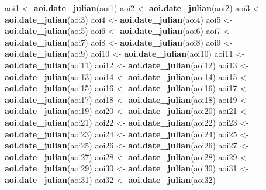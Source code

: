 \documentclass[
]{article}
\newenvironment{Shaded}{\begin{snugshade}}{\end{snugshade}}
\newcommand{\KeywordTok}[1]{\textcolor[rgb]{0.13,0.29,0.53}{\textbf{#1}}}
\newcommand{\NormalTok}[1]{#1}
\newcommand{\StringTok}[1]{\textcolor[rgb]{0.31,0.60,0.02}{#1}}
\begin{document}
\begin{Shaded}
\begin{Highlighting}[]
\NormalTok{aoi1 <-}\StringTok{ }\KeywordTok{aoi.date_julian}\NormalTok{(aoi1)}
\NormalTok{aoi2 <-}\StringTok{ }\KeywordTok{aoi.date_julian}\NormalTok{(aoi2)}
\NormalTok{aoi3 <-}\StringTok{ }\KeywordTok{aoi.date_julian}\NormalTok{(aoi3)}
\NormalTok{aoi4 <-}\StringTok{ }\KeywordTok{aoi.date_julian}\NormalTok{(aoi4)}
\NormalTok{aoi5 <-}\StringTok{ }\KeywordTok{aoi.date_julian}\NormalTok{(aoi5)}
\NormalTok{aoi6 <-}\StringTok{ }\KeywordTok{aoi.date_julian}\NormalTok{(aoi6)}
\NormalTok{aoi7 <-}\StringTok{ }\KeywordTok{aoi.date_julian}\NormalTok{(aoi7)}
\NormalTok{aoi8 <-}\StringTok{ }\KeywordTok{aoi.date_julian}\NormalTok{(aoi8)}
\NormalTok{aoi9 <-}\StringTok{ }\KeywordTok{aoi.date_julian}\NormalTok{(aoi9)}
\NormalTok{aoi10 <-}\StringTok{ }\KeywordTok{aoi.date_julian}\NormalTok{(aoi10)}
\NormalTok{aoi11 <-}\StringTok{ }\KeywordTok{aoi.date_julian}\NormalTok{(aoi11)}
\NormalTok{aoi12 <-}\StringTok{ }\KeywordTok{aoi.date_julian}\NormalTok{(aoi12)}
\NormalTok{aoi13 <-}\StringTok{ }\KeywordTok{aoi.date_julian}\NormalTok{(aoi13)}
\NormalTok{aoi14 <-}\StringTok{ }\KeywordTok{aoi.date_julian}\NormalTok{(aoi14)}
\NormalTok{aoi15 <-}\StringTok{ }\KeywordTok{aoi.date_julian}\NormalTok{(aoi15)}
\NormalTok{aoi16 <-}\StringTok{ }\KeywordTok{aoi.date_julian}\NormalTok{(aoi16)}
\NormalTok{aoi17 <-}\StringTok{ }\KeywordTok{aoi.date_julian}\NormalTok{(aoi17)}
\NormalTok{aoi18 <-}\StringTok{ }\KeywordTok{aoi.date_julian}\NormalTok{(aoi18)}
\NormalTok{aoi19 <-}\StringTok{ }\KeywordTok{aoi.date_julian}\NormalTok{(aoi19)}
\NormalTok{aoi20 <-}\StringTok{ }\KeywordTok{aoi.date_julian}\NormalTok{(aoi20)}
\NormalTok{aoi21 <-}\StringTok{ }\KeywordTok{aoi.date_julian}\NormalTok{(aoi21)}
\NormalTok{aoi22 <-}\StringTok{ }\KeywordTok{aoi.date_julian}\NormalTok{(aoi22)}
\NormalTok{aoi23 <-}\StringTok{ }\KeywordTok{aoi.date_julian}\NormalTok{(aoi23)}
\NormalTok{aoi24 <-}\StringTok{ }\KeywordTok{aoi.date_julian}\NormalTok{(aoi24)}
\NormalTok{aoi25 <-}\StringTok{ }\KeywordTok{aoi.date_julian}\NormalTok{(aoi25)}
\NormalTok{aoi26 <-}\StringTok{ }\KeywordTok{aoi.date_julian}\NormalTok{(aoi26)}
\NormalTok{aoi27 <-}\StringTok{ }\KeywordTok{aoi.date_julian}\NormalTok{(aoi27)}
\NormalTok{aoi28 <-}\StringTok{ }\KeywordTok{aoi.date_julian}\NormalTok{(aoi28)}
\NormalTok{aoi29 <-}\StringTok{ }\KeywordTok{aoi.date_julian}\NormalTok{(aoi29)}
\NormalTok{aoi30 <-}\StringTok{ }\KeywordTok{aoi.date_julian}\NormalTok{(aoi30)}
\NormalTok{aoi31 <-}\StringTok{ }\KeywordTok{aoi.date_julian}\NormalTok{(aoi31)}
\NormalTok{aoi32 <-}\StringTok{ }\KeywordTok{aoi.date_julian}\NormalTok{(aoi32)}
\end{Highlighting}
\end{Shaded}
\end{document}
